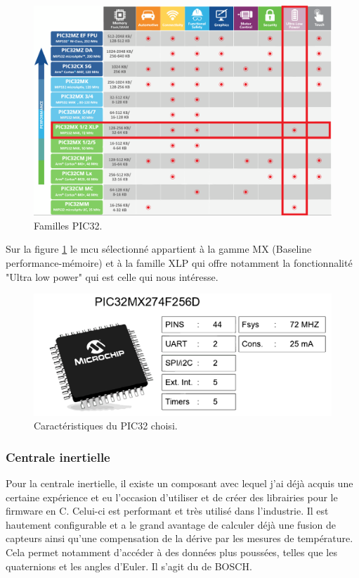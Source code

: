 \begin{figure}[h]
	\centering
	\includegraphics[width=0.65\linewidth]{../figures/pre_etude/familles_pic32}
	\caption{Familles PIC32.}
	\label{fig:famillespic32}
\end{figure}

Sur la figure \ref{fig:famillespic32} le \gls{mcu} sélectionné appartient à la gamme MX (Baseline performance-mémoire) et à la famille XLP qui offre notamment la fonctionnalité "Ultra low power" qui est celle qui nous intéresse.

\begin{figure}[h]
	\centering
	\includegraphics[width=0.7\linewidth]{../figures/pre_etude/Carac_PIC32}
	\caption{Caractéristiques du PIC32 choisi.}
	\label{fig:caracpic32}
\end{figure}

\clearpage
\subsubsection{Centrale inertielle} \label{sssection:choix-IMU}
Pour la centrale inertielle, il existe un composant avec lequel j'ai déjà acquis une certaine expérience et eu l'occasion d'utiliser et de créer des librairies pour le firmware en C. Celui-ci est performant et très utilisé dans l'industrie. Il est hautement configurable et a le grand avantage de calculer déjà une fusion de capteurs ainsi qu'une compensation de la dérive par les mesures de température. Cela permet notamment d'accéder à des données plus poussées, telles que les quaternions et les angles d'Euler. Il s'agit du  de BOSCH.
 
